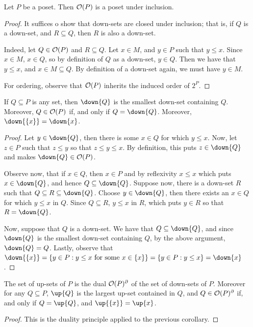 \begin{lemma}\label{lemma_1.6.1}
  Let $P$ be a poset. Then  $\mathcal{O}(P)$ is a poset under inclusion.
\end{lemma}
\begin{proof}
  It suffices o show that down-sets are closed under inclusion; that
  is, if $Q$ is a down-set, and $R \subseteq Q$, then $R$ is also a
  down-set.

  Indeed, let $Q \in \mathcal{O}(P)$ and $R \subseteq Q$. Let $x \in M$, and
  $y \in P$ such that $y \leq x$. Since $x \in M$, $x \in Q$, so by
  definition of $Q$ as a down-set, $y \in Q$. Then we have that $y
  \leq x$, and $x \in M \subseteq Q$. By definition of a down-set
  again, we must have $y \in M$.

  For ordering, observe that $\mathcal{O}(P)$ inherits the induced order of
  $2^P$.
\end{proof}
\begin{corollary}
  If $Q \subseteq P$ is any set, then $\down{Q}$ is the smallest
  down-set containing $Q$. Moreover,  $Q \in \mathcal{O}(P)$ if, and only if
  $Q=\down{Q}$. Moreover, $\down{\{x\}}=\down{x}$.
\end{corollary}
\begin{proof}
  Let $y \in \down{Q}$, then there is some $x \in Q$ for which $y \leq
  x$. Now, let $z \in P$ such that $z \leq y$ so that $z \leq y \leq
  x$. By definition, this puts $z \in \down{Q}$ and makes $\down{Q}
  \in \Oc(P)$.

  Observe now, that if $x \in Q$, then $x \in P$ and by reflexivity $x
  \leq x$ which puts $x \in \down{Q}$, and hence $Q \subseteq
  \down{Q}$. Suppose now, there is a down-set $R$ such that $Q
  \subseteq R \subseteq \down{Q}$. Choose $y \in \down{Q}$, then there
  exists an $x \in Q$ for which $y \leq x$ in $Q$. Since  $Q \subseteq
  R$, $y \leq x$ in $R$, which puts  $y \in R$ so that $R=\down{Q}$.

  Now, suppose that $Q$ is a down-set. We have that $Q \subseteq
  \down{Q}$, and since $\down{Q}$ is the smallest down-set containing
  $Q$, by the above argument,  $\down{Q}=Q$. Lastly, observe that
  $\down{\{x\}}=\{y \in P : y \leq x \text{ for some } x \in
  \{x\}\}=\{y \in P : y \leq x\}=\down{x}$.
\end{proof}
\begin{corollary}
  The set of up-sets of $P$ is the dual $\mathcal{O}(P)^\partial$ of the set
  of down-sets of $P$. Moreover for any $Q \subseteq P$, $\up{Q}$ is
  the largest up-set contained in $Q$, and  $Q \in \mathcal{O}(P)^\partial$
  if, and only if $Q=\up{Q}$, and $\up{\{x\}}=\up{x}$.
\end{corollary}
\begin{proof}
  This is the duality principle applied to the previous corollary.
\end{proof}

